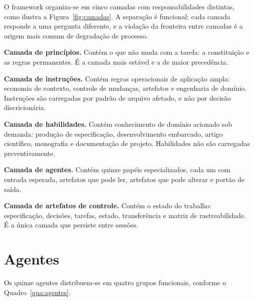 O framework organiza-se em cinco camadas com responsabilidades distintas, como
ilustra a Figura~\ref{fig:camadas}. A separação é funcional: cada camada responde
a uma pergunta diferente, e a violação da fronteira entre camadas é a origem mais
comum de degradação de processo.



\textbf{Camada de princípios.} Contém o que não muda com a tarefa: a constituição
e as regras permanentes. É a camada mais estável e a de maior precedência.

\textbf{Camada de instruções.} Contém regras operacionais de aplicação ampla:
economia de contexto, controle de mudanças, artefatos e engenharia de domínio.
Instruções são carregadas por padrão de arquivo afetado, e não por decisão
discricionária.

\textbf{Camada de habilidades.} Contém conhecimento de domínio acionado sob
demanda: produção de especificação, desenvolvimento embarcado, artigo científico,
monografia e documentação de projeto. Habilidades não são carregadas
preventivamente.

\textbf{Camada de agentes.} Contém quinze papéis especializados, cada um com
entrada esperada, artefatos que pode ler, artefatos que pode alterar e portão de
saída.

\textbf{Camada de artefatos de controle.} Contém o estado do trabalho:
especificação, decisões, tarefas, estado, transferência e matriz de
rastreabilidade. É a única camada que persiste entre sessões.

\section{Agentes}
\label{sec:fw-agentes}

Os quinze agentes distribuem-se em quatro grupos funcionais, conforme o
Quadro~\ref{qua:agentes}.

